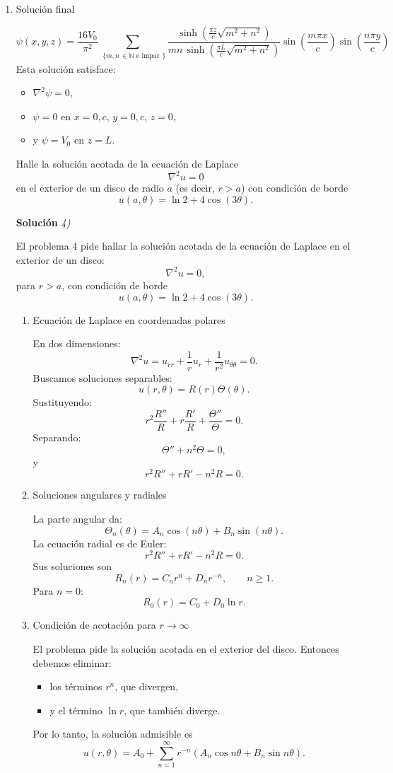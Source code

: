 \documentclass[11pt,spanish]{article}
\newcommand{\NN}{\mathbb{N}}
\newcounter{problema}
\newcommand{\prob}{\stepcounter{problema} \vspace{.5cm} \noindent{\bf Problema \arabic{problema}: }}
\begin{document}
\begin{enumerate}
\item Solución final

$$
\boxed{
\psi(x,y,z)=
\frac{16V_0}{\pi^2}
\sum_{\substack{\{m,n\, \in \NN \text{ e impar}}\}}
\frac{
\sinh\left(
\frac{\pi z}{c}\sqrt{m^2+n^2}
\right)
}{
mn\,
\sinh\left(
\frac{\pi L}{c}\sqrt{m^2+n^2}
\right)
}
\sin\left(\frac{m\pi x}{c}\right)
\sin\left(\frac{n\pi y}{c}\right)
}
$$
Esta solución satisface:
\begin{itemize}
\item $\nabla^2\psi=0$,
\item $\psi=0$ en $x=0,c$, $y=0,c$, $z=0$,
\item y $\psi=V_0$ en $z=L$.
\end{itemize}

\prob Halle la solución acotada de la ecuación de Laplace
\[
\nabla^2 u = 0
\]
en el exterior de un disco de radio \(a\) (es decir, \(r>a\)) con condición de borde
\[
u(a,\theta) = \ln 2 + 4\cos(3\theta).
\]

\vspace{0.5cm}
{\bf Soluci\'on }{\em 4)}
\vspace{0.5cm}


El problema 4 pide hallar la solución acotada de la ecuación de Laplace en el exterior de un disco: 
$$
\nabla^2 u =0,
$$
para $r>a$, con condición de borde
$$
u(a,\theta)=\ln 2 +4\cos(3\theta).
$$

\begin{enumerate}
\item Ecuación de Laplace en coordenadas polares

En dos dimensiones:
$$
\nabla^2 u=
u_{rr}+\frac1r u_r+\frac1{r^2}u_{\theta\theta}=0.
$$
Buscamos soluciones separables:
$$
u(r,\theta)=R(r)\Theta(\theta).
$$
Sustituyendo:
$$
r^2\frac{R''}{R}
+r\frac{R'}{R}
+\frac{\Theta''}{\Theta}=0.
$$
Separando:
$$
\Theta''+n^2\Theta=0,
$$
y
$$
r^2R''+rR'-n^2R=0.
$$

\item Soluciones angulares y radiales

La parte angular da:
$$
\Theta_n(\theta)=
A_n\cos(n\theta)+B_n\sin(n\theta).
$$
La ecuación radial es de Euler:
$$
r^2R''+rR'-n^2R=0.
$$
Sus soluciones son
$$
R_n(r)=C_nr^n+D_nr^{-n},
\qquad n\ge1.
$$
Para $n=0$:
$$
R_0(r)=C_0+D_0\ln r.
$$

\item Condición de acotación para $r\to\infty$

El problema pide la solución acotada en el exterior del disco.
Entonces debemos eliminar:
\begin{itemize}
\item los términos $r^n$, que divergen,
\item y el término $\ln r$, que también diverge.
\end{itemize}
Por lo tanto, la solución admisible es
$$
u(r,\theta)=
A_0+
\sum_{n=1}^\infty
r^{-n}
\left(
A_n\cos n\theta
+
B_n\sin n\theta
\right).
$$


\end{enumerate}
\end{enumerate}
\end{document}
